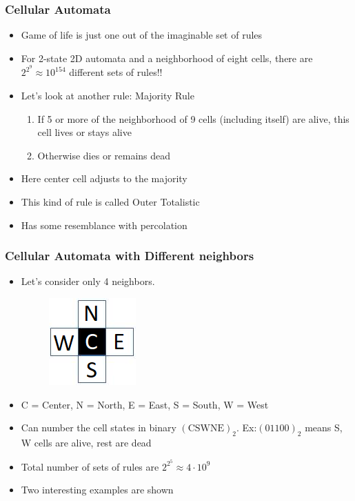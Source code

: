 \documentclass{beamer}
\begin{document}
\begin{frame}
    \frametitle{Cellular Automata} 
    \begin{itemize}
        \item Game of life is just one out of the imaginable set of rules 
        \item For 2-state 2D automata and a neighborhood of eight cells, there are $2^{2^9} \approx 10^{154}$ different sets of rules!!
        \item Let's look at another rule: Majority Rule
        \begin{enumerate}
            \item If 5 or more of the neighborhood of 9 cells (including itself) are alive, this cell lives or stays alive 
            \item Otherwise dies or remains dead
        \end{enumerate}
        \item Here center cell adjusts to the majority 
        \item This kind of rule is called Outer Totalistic
        \item Has some resemblance with percolation
    \end{itemize}
\end{frame}

\begin{frame}
    \frametitle{Cellular Automata with Different neighbors}
    \begin{itemize}
        \item Let's consider only 4 neighbors.
        \begin{figure}
            \centering
            \includegraphics[scale=0.5]{VonNeigh.png}
        \end{figure}
        \item C = Center, N = North, E = East, S = South, W = West
        \item Can number the cell states in binary $(\text{CSWNE})_2$. Ex:$(01100)_2$ means S, W cells are alive, rest are dead
        \item Total number of sets of rules are $2^{2^5} \approx 4 \cdot 10^9$
        \item Two interesting examples are shown 
    \end{itemize}
\end{frame}
\end{document}
